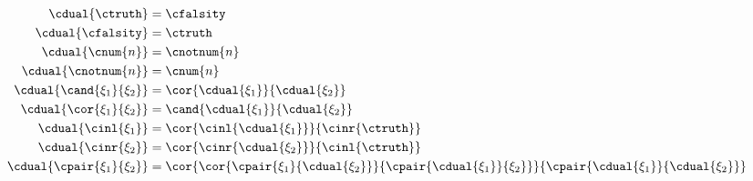 
\begin{figure}[ht]
\begin{align*}
  \cdual{\ctruth} &= \cfalsity \\
  \cdual{\cfalsity} &= \ctruth \\
  \cdual{\cnum{n}} &= \cnotnum{n} \\
  \cdual{\cnotnum{n}} &= \cnum{n} \\
  \cdual{\cand{\xi_1}{\xi_2}} &= \cor{\cdual{\xi_1}}{\cdual{\xi_2}} \\
  \cdual{\cor{\xi_1}{\xi_2}} &= \cand{\cdual{\xi_1}}{\cdual{\xi_2}} \\
  \cdual{\cinl{\xi_1}} &= \cor{ \cinl{\cdual{\xi_1}} }{ \cinr{\ctruth} } \\
  \cdual{\cinr{\xi_2}} &= \cor{ \cinr{\cdual{\xi_2}} }{ \cinl{\ctruth} } \\
  \cdual{\cpair{\xi_1}{\xi_2}} &=
  \cor{ \cor{ 
    \cpair{\xi_1}{\cdual{\xi_2}}
  }{
    \cpair{\cdual{\xi_1}}{\xi_2}
  }}{
    \cpair{\cdual{\xi_1}}{\cdual{\xi_2}}
  }
\end{align*}

\end{figure}
